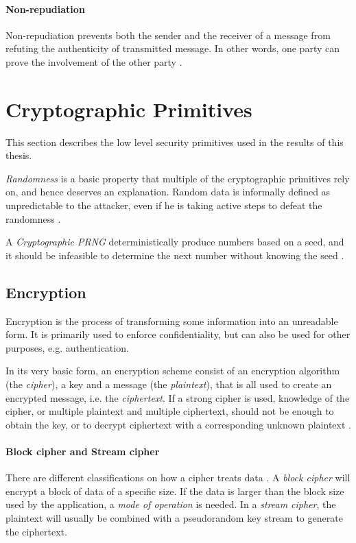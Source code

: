 \documentclass[pdftex,english,10pt,b5paper,twoside]{book}
\begin{document}
\paragraph{Non-repudiation} Non-repudiation prevents both the sender and the
receiver of a message from refuting the authenticity of transmitted message. In
other words, one party can prove the involvement of the other party
\cite{stallings}.

\section{Cryptographic Primitives}

This section describes the low level security primitives used in the results of
this thesis. 

\emph{Randomness} is a basic property that multiple of the cryptographic
primitives rely on, and hence deserves an explanation. Random data is
informally defined as unpredictable to the attacker, even if he is taking
active steps to defeat the randomness \cite[p. 137]{schneier}.  

A \emph{Cryptographic \ac{PRNG}} deterministically produce numbers based on a
seed, and it should be infeasible to determine the next number without knowing
the seed \cite[p. 140]{schneier}.

\subsection{Encryption}

Encryption is the process of transforming some information into an unreadable
form. It is primarily used to enforce confidentiality, but can also be
used for other purposes, e.g. authentication. 

In its very basic form, an encryption scheme consist of an encryption algorithm
(the \emph{cipher}), a key and a message (the \emph{plaintext}), that is all
used to create an encrypted message, i.e. the \emph{ciphertext}. If a strong
cipher is used, knowledge of the cipher, or multiple plaintext and multiple
ciphertext, should not be enough to obtain the key, or to decrypt ciphertext
with a corresponding unknown plaintext \cite{schneier}.

\paragraph{Block cipher and Stream cipher} There are different classifications
on how a cipher treats data \cite[p. 32]{stallings}. A \emph{block cipher} will
encrypt a block of data of a specific size. If the data is larger than the
block size used by the application, a \emph{mode of operation} is needed. In a
\emph{stream cipher}, the plaintext will usually be combined with a pseudorandom key
stream to generate the ciphertext.
\end{document}
